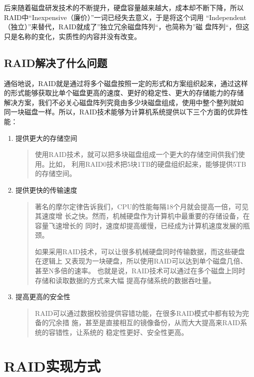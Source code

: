 后来随着磁盘研发技术的不断提升，硬盘容量越来越大，成本却不断下降，所以
RAID中“Inexpensive（廉价）”一词已经失去意义，于是将这个词用
“Independent（独立）”来替代，RAID就成了”独立冗余磁盘阵列“，也简称为”磁
盘阵列“，但这只是名称的变化，实质性的内容并没有改变。

\subsection{RAID解决了什么问题}

通俗地说，RAID就是通过将多个磁盘按照一定的形式和方案组织起来，通过这样
的形式能够获取比单个磁盘更高的速度、更好的稳定性、更大的存储能力的存储
解决方案，我们不必关心磁盘阵列究竟由多少块磁盘组成，使用中整个整列就如
同一块磁盘一样。所以，RAID技术能够为计算机系统提供以下三个方面的优异性
能：

\begin{enumerate}[itemsep=0pt,parsep=0pt]
\item 提供更大的存储空间
\begin{quote}
  使用RAID技术，就可以把多块磁盘组成一个更大的存储空间供我们使用。比如，
  利用RAID0技术把5块1TB的硬盘组织起来，能够提供5TB的存储空间。
\end{quote}

\item 提供更快的传输速度
\begin{quote}
  著名的摩尔定律告诉我们，CPU的性能每隔18个月就会提高一倍，可见其速度增
  长之快。然而，机械硬盘作为计算机中最重要的存储设备，在容量飞速增长的
  同时，速度却提高缓慢，已经成为计算机速度发展的瓶颈。

  如果采用RAID技术，可以让很多机械硬盘同时传输数据，而这些硬盘在逻辑上
  又表现为一块硬盘，所以使用RAID可以达到单个磁盘几倍、甚至N多倍的速率。
  也就是说，RAID技术可以通过在多个磁盘上同时存储和读取数据的方式来大幅
  提高存储系统的数据吞吐量。
\end{quote}

\item 提高更高的安全性
\begin{quote}
RAID可以通过数据校验提供容错功能，在很多RAID模式中都有较为完备的冗余措
施，甚至是直接相互的镜像备份，从而大大提高来RAID系统的容错性，让系统的
稳定性更好、安全性更高。
\end{quote}
\end{enumerate}

\section{RAID实现方式}


